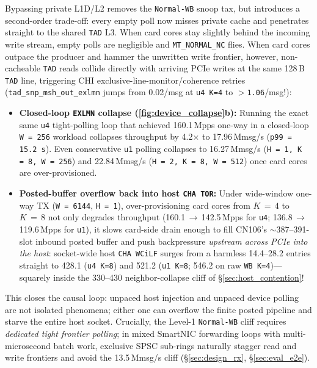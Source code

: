 Bypassing private L1D/L2 removes the \texttt{Normal-WB} snoop tax, but introduces a second-order trade-off: every empty poll now misses private cache and penetrates straight to the shared \texttt{TAD} L3. When card cores stay slightly behind the incoming write stream, empty polls are negligible and \texttt{MT\_NORMAL\_NC} flies. When card cores outpace the producer and hammer the unwritten write frontier, however, non-cacheable \texttt{TAD} reads collide directly with arriving PCIe writes at the same 128\,B \texttt{TAD} line, triggering CHI exclusive-line-monitor/coherence retries (\texttt{tad\_snp\_msh\_out\_exlmn} jumps from 0.02/msg at \texttt{u4 K=4} to \texttt{$>$1.06}/msg!):
\begin{itemize}
  \item \textbf{Closed-loop \texttt{EXLMN} collapse (\autoref{fig:device_collapse}b):} Running the exact same \texttt{u4} tight-polling loop that achieved 160.1\,Mpps one-way in a closed-loop \texttt{W\,=\,256} workload collapses throughput by 4.2$\times$ to 17.96\,Mmsg/s (\texttt{p99\,=\,15.2\,\textmu s}). Even conservative \texttt{u1} polling collapses to 16.27\,Mmsg/s (\texttt{H\,=\,1, K\,=\,8, W\,=\,256}) and 22.84\,Mmsg/s (\texttt{H\,=\,2, K\,=\,8, W\,=\,512}) once card cores are over-provisioned.
  \item \textbf{Posted-buffer overflow back into host \texttt{CHA TOR}:} Under wide-window one-way TX (\texttt{W\,=\,6144}, \texttt{H\,=\,1}), over-provisioning card cores from $K\,=\,4$ to $K\,=\,8$ not only degrades throughput (160.1\,$\to$\,142.5\,Mpps for \texttt{u4}; 136.8\,$\to$\,119.6\,Mpps for \texttt{u1}), it slows card-side drain enough to fill CN106's $\sim$387--391-slot inbound posted buffer and push backpressure \emph{upstream across PCIe into the host}: socket-wide host \texttt{CHA WCiLF} surges from a harmless 14.4--28.2 entries straight to 428.1 (\texttt{u4 K=8}) and 521.2 (\texttt{u1 K=8}; 546.2 on raw \texttt{WB K=4})---squarely inside the 330--430 neighbor-collapse cliff of \S\ref{sec:host_contention}!
\end{itemize}
This closes the causal loop: unpaced host injection and unpaced device polling are not isolated phenomena; either one can overflow the finite posted pipeline and starve the entire host socket. Crucially, the Level-1 \texttt{Normal-WB} cliff requires \emph{dedicated tight frontier polling}; in mixed SmartNIC forwarding loops with multi-microsecond batch work, exclusive SPSC sub-rings naturally stagger read and write frontiers and avoid the 13.5\,Mmsg/s cliff (\S\ref{sec:design_rx}, \S\ref{sec:eval_e2e}).
